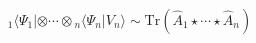\begin{equation}
{}_{1}\langle \Psi_1|\otimes \cdots \otimes {}_{n}\langle \Psi_n
|V_{n}\rangle \sim \mbox{Tr}(\hat{A}_1\star \cdots \star \hat{A}_n)
\label{e_basic_corresp}
\end{equation}

